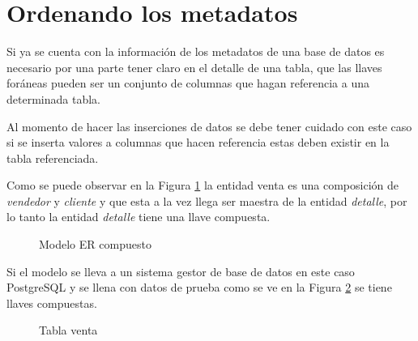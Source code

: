 \section{Ordenando los metadatos}
Si ya se cuenta con la informaci\'on de los metadatos de una base de datos es necesario por una parte tener claro en el detalle de una tabla, que las llaves for\'aneas pueden ser un conjunto de columnas que hagan referencia a una determinada tabla.

Al momento de hacer las inserciones de datos se debe tener cuidado con este caso si se inserta valores a columnas que hacen referencia estas deben existir en la tabla referenciada.

Como se puede observar en la Figura \ref{fig:ModeloERcomp} la entidad venta es una composici\'on de \textit{vendedor} y \textit{cliente} y que esta a la vez llega ser maestra de la entidad \textit{detalle}, por lo tanto la entidad \textit{detalle} tiene una llave compuesta.
\begin{figure}[H]
\centering
{}
\caption{Modelo ER compuesto} \label{fig:ModeloERcomp}
\end{figure}
Si el modelo se lleva a un sistema gestor de base de datos en este caso PostgreSQL y se llena con datos de prueba como se ve en la Figura \ref{fig:tabla venta} se tiene  llaves compuestas.
\begin{figure}[H]
\centering
{}
\caption{Tabla venta} \label{fig:tabla venta}
\end{figure}

